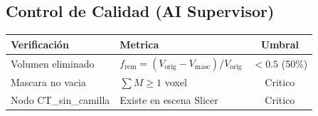 \documentclass[12pt,a4paper]{article}
\begin{document}
\begin{tcolorbox}[aiSupervisor]
\subsection*{Control de Calidad (AI Supervisor)}

\begin{table}[H]
\centering
\begin{tabular}{llc}
\toprule
\textbf{Verificación} & \textbf{Metrica} & \textbf{Umbral} \\
\midrule
Volumen eliminado & $f_{\text{rem}} = (V_{\text{orig}} - V_{\text{masc}})/V_{\text{orig}}$ & $< 0.5$ (50\%) \\
Mascara no vacia & $\sum M \geq 1$ voxel & Critico \\
Nodo CT\_sin\_camilla & Existe en escena Slicer & Critico \\
\bottomrule
\end{tabular}
\end{table}

\newpage


\newpage


\newpage


\newpage


\newpage


\newpage


\newpage


\newpage

\end{tcolorbox}
\end{document}
